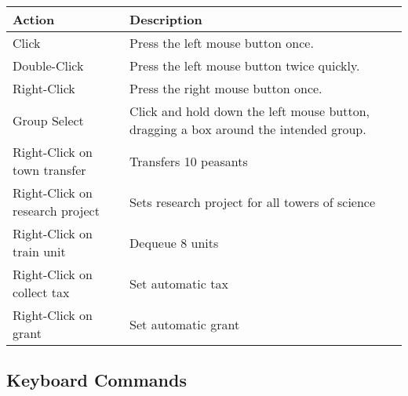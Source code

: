 \begin{center}
	\begin{tabular}{|p{2in}|p{2in}|}
		\hline
		Action	& Description \\ \hline
		Click	& Press the left mouse button once. \\ \hline
		Double-Click	& Press the left mouse button twice quickly. \\ \hline
		Right-Click	& Press the right mouse button once. \\ \hline
		Group Select	& Click and hold down the left mouse button, dragging a box around the intended group. \\ \hline
		Right-Click on town transfer	& Transfers 10 peasants \\ \hline
		Right-Click on research project	& Sets research project for all towers of science \\ \hline
		Right-Click on train unit	& Dequeue 8 units \\ \hline
		Right-Click on collect tax	& Set automatic tax \\ \hline
		Right-Click on grant	&  Set automatic grant \\
		\hline
	\end{tabular}
\end{center}

\clearpage

\subsection{Keyboard Commands}


